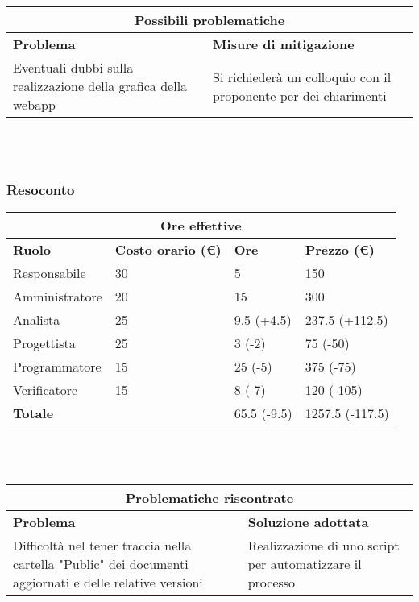 \documentclass[a4paper, 12pt]{article}
\begin{document}
\begin{center}
    \begin{tabularx}{\textwidth}{|X|X|}
        \hline
        \multicolumn{2}{|c|}{\textbf{Possibili problematiche}}\\
        \hline
        \hline
        \textbf{Problema} & \textbf{Misure di mitigazione}\\
        \hline
        Eventuali dubbi sulla realizzazione della grafica della webapp & Si richiederà un colloquio con il proponente per dei chiarimenti\\
        \hline
    \end{tabularx}\\[8pt]
    \mbox{}\\
\end{center}
\clearpage
\subsubsection{Resoconto}\mbox{}

\begin{center}
    \begin{tabularx}{\textwidth}{|X|X|X|X|}
        \hline
        \multicolumn{4}{|c|}{\textbf{Ore effettive}}\\
        \hline
        \hline
        \textbf{Ruolo} & \textbf{Costo orario (\euro)} & \textbf{Ore} & \textbf{Prezzo (\euro)}\\
        \hline
        Responsabile    & 30 & 5  & 150\\
        \hline
        Amministratore  & 20 & 15  & 300\\
        \hline
        Analista        & 25 & 9.5 (+4.5)  & 237.5 (+112.5)\\
        \hline
        Progettista     & 25 & 3 (-2) & 75 (-50)\\
        \hline
        Programmatore   & 15 & 25 (-5)  & 375 (-75)\\
        \hline
        Verificatore    & 15 & 8 (-7)  & 120 (-105)\\
        \hline
        \hline
        \textbf{Totale} &    & 65.5 (-9.5) & 1257.5 (-117.5)\\
        \hline
    \end{tabularx}\\[8pt]
    \mbox{}\\
\end{center}

\begin{center}
    \begin{tabularx}{\textwidth}{|X|X|}
        \hline
        \multicolumn{2}{|c|}{\textbf{Problematiche riscontrate}}\\
        \hline
        \hline
        \textbf{Problema} & \textbf{Soluzione adottata}\\
        \hline
        Difficoltà nel tener traccia nella cartella "Public" dei documenti aggiornati e delle relative versioni & Realizzazione di uno script per automatizzare il processo\\
        \hline
    \end{tabularx}\\[8pt]
    \mbox{}\\
\end{center}
\end{document}
